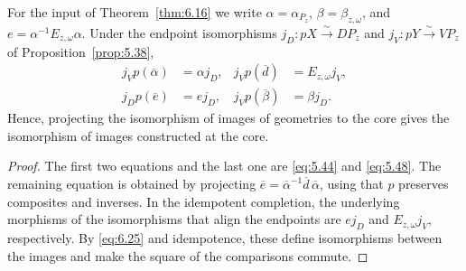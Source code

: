 \begin{proposition}\label{prop:6.17}

For the input of Theorem~\ref{thm:6.16} we write $\alpha=\alpha_{P_z}$,
$\beta=\beta_{z,\omega}$, and $e=\alpha^{-1}E_{z,\omega}\alpha$.
Under the endpoint isomorphisms $j_D:pX\xrightarrow{\sim}DP_z$ and
$j_V:pY\xrightarrow{\sim}VP_z$ of Proposition~\ref{prop:5.38},
\begin{equation*}
\begin{aligned}
j_Vp(\overline\alpha)&=\alpha j_D,&
j_Vp(\overline d)&=E_{z,\omega}j_V,\\
j_Dp(\overline e)&=e j_D,&
j_Vp(\overline\beta)&=\beta j_D.
\end{aligned}
\tag{6.25}\label{eq:6.25}
\end{equation*}
Hence, projecting the isomorphism of images of geometries to the core gives the isomorphism
of images constructed at the core.

\end{proposition}

\begin{proof}

The first two equations and the last one are \eqref{eq:5.44} and \eqref{eq:5.48}.
The remaining equation is obtained by projecting
$\overline e=\overline\alpha^{-1}\overline d\,\overline\alpha$, using that $p$ preserves
composites and inverses.
In the idempotent completion, the underlying morphisms of the isomorphisms that align the
endpoints are $e j_D$ and $E_{z,\omega} j_V$, respectively.
By \eqref{eq:6.25} and idempotence, these define isomorphisms between the images and make
the square of the comparisons commute.

\end{proof}

